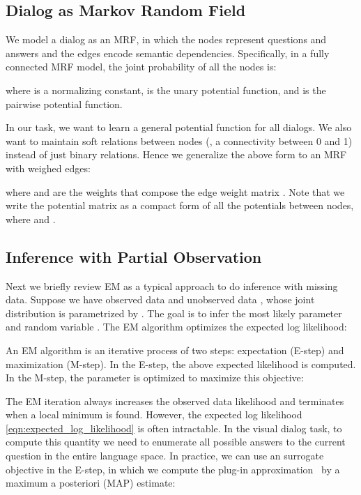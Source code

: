 \documentclass[10pt,twocolumn,letterpaper]{article}
\begin{document}
\subsection{Dialog as Markov Random Field}
We model a dialog as an MRF, in which the nodes represent questions and answers and the edges encode semantic dependencies. Specifically, in a fully connected MRF model, the joint probability of all the nodes  is:
\vspace{-2pt}

where  is a normalizing constant,  is the unary potential function, and  is the pairwise potential function.

In our task, we want to learn a general potential function for all dialogs. We also want to maintain soft relations between nodes (\ie, a connectivity between 0 and 1) instead of just binary relations. Hence we generalize the above form to an MRF with  weighed edges:
\vspace{-2pt}

where  and  are the weights that compose the edge weight matrix . Note that we write  the potential matrix as a compact form of all the potentials between nodes, where  and .

\subsection{Inference with Partial Observation}
Next we briefly review EM as a typical approach to do inference with missing data.
Suppose we have observed data  and unobserved data , whose joint distribution is parametrized by . The goal is to infer the most likely parameter  and random variable . The EM algorithm optimizes the expected log likelihood:
\vspace{-2pt}


An EM algorithm is an iterative process of two steps: expectation (E-step) and maximization (M-step). In the E-step, the above expected likelihood is computed. In the M-step, the parameter  is optimized to maximize this objective:


The EM iteration always increases the observed data likelihood and terminates when a local minimum is found. However, the expected log likelihood \autoref{eqn:expected_log_likelihood} is often intractable. In the visual dialog task, to compute this quantity we need to enumerate all possible answers to the current question in the entire language space. In practice, we can use an surrogate objective in the E-step, in which we compute the plug-in approximation~\cite{van2000asymptotic} by a maximum a posteriori (MAP) estimate:
\vspace{-2pt}
\end{document}
